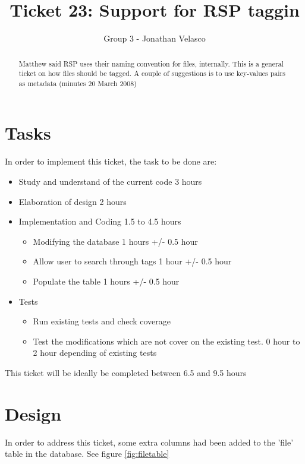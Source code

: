 \documentclass[a4paper,10pt]{article}
\title{Ticket 23: Support for RSP taggin}
\author{Group 3 - Jonathan Velasco}
\begin{document}
\maketitle

\begin{abstract}

Matthew said RSP uses their naming convention for files, internally.  This is a general ticket on how files should be tagged.  A couple of suggestions is to use key-values pairs as metadata  (minutes 20 March 2008)

\end{abstract}

\section{Tasks}

In order to implement this ticket, the task to be done are:

\begin{itemize}
 \item Study and understand of the current code 3  hours
 \item Elaboration of design 2 hours
 \item Implementation and Coding 1.5 to 4.5 hours
 \begin{itemize}
  \item Modifying the database 1 hours +/- 0.5 hour
  \item Allow user to search through tags 1 hour +/- 0.5 hour
  \item Populate the table 1 hours +/- 0.5 hour
 \end{itemize}
 \item Tests
  \begin{itemize}
   \item Run existing tests and check coverage
   \item Test the modifications which are not cover on the existing test.  0 hour to 2 hour depending of existing tests
  \end{itemize}

\end{itemize}

This ticket will be ideally be completed between 6.5 and 9.5 hours


\section{Design}

In order to address this ticket, some extra columns had been added to the 'file' table in the database.  See figure \ref{fig:filetable}
\end{document}
